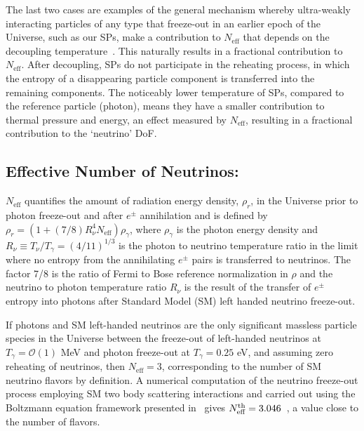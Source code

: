 The last two cases are examples of the general mechanism whereby ultra-weakly interacting particles of any type that freeze-out in an earlier epoch of the Universe, such as our SPs, make a contribution to $N_{\text{eff}}$ that depends on the decoupling temperature~\cite{Anchordoqui:2011nh,Anchordoqui:2012qu,Blennow:2012de,Steigman:2013yua}. This  naturally results in a fractional contribution to $N_{\text{eff}}$. After decoupling, SPs do not participate in the reheating process, in which the entropy of a disappearing  particle component is transferred into the remaining components. The noticeably lower temperature of SPs, compared to the reference particle (photon), means they have a smaller contribution to thermal pressure and energy, an effect measured by $N_{\text{eff}}$, resulting in a fractional contribution to the `neutrino' DoF. \\[-0.2cm]


\subsection{Effective Number of Neutrinos:}
$N_{\text{eff}}$ quantifies the amount of radiation energy density, $\rho_r$, in the Universe prior to photon freeze-out and after $e^\pm$ annihilation and is defined by $\rho_r=(1+(7/8)R_\nu^{4}N_{\text{eff}})\rho_\gamma$, where $\rho_\gamma$ is the photon energy density and  $R_\nu\equiv T_\nu/T_\gamma=({4}/{11})^{1/3}$ is the photon to neutrino temperature ratio in the limit where no entropy from the annihilating $e^\pm$ pairs is transferred to neutrinos.  The factor 7/8 is the ratio of Fermi to Bose reference normalization in $\rho$ and the neutrino to photon temperature ratio $R_\nu$ is the result of the transfer of $e^\pm$ entropy into photons after Standard Model (SM) left handed neutrino freeze-out.

If photons and SM left-handed neutrinos are the only significant massless particle species in the Universe between the freeze-out of left-handed neutrinos at  $T_\gamma=\mathcal{O}(1)$ MeV and photon freeze-out at $T_\gamma=0.25$ eV, and assuming zero reheating of neutrinos, then $N_{\text{eff}}=3$, corresponding to the number of SM neutrino flavors  by definition.  A numerical computation of the neutrino freeze-out process employing SM two body scattering interactions and carried out using the Boltzmann equation framework presented in~\cite{Dicus:1982bz} gives $N_{\text{eff}}^{\rm th}=3.046$~\cite{Mangano2005}, a value close to the number of flavors.  

